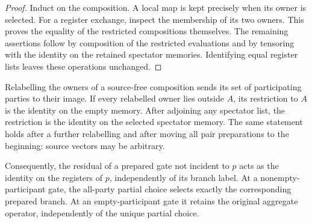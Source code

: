 \begin{proof}
    \leanok
    Induct on the composition. A local map is kept precisely when its owner is
    selected. For a register exchange, inspect the membership of its two owners.
    This proves the equality of the restricted compositions themselves. The
    remaining assertions follow by composition of the restricted evaluations
    and by tensoring with the identity on the retained spectator memories.
    Identifying equal register lists leaves these operations unchanged.
\end{proof}

\begin{theorem}
    \label{thm:peps_chrono_disjoint}
    \leanok
    Relabelling the owners of a source-free composition sends its set of
    participating parties to their image. If every relabelled owner lies outside
    $A$, its restriction to $A$ is the identity on the empty memory.
    After adjoining any spectator list, the restriction is the identity on the
    selected spectator memory. The same statement holds after a further
    relabelling and after moving all pair preparations to the beginning: source
    vectors may be arbitrary.

    Consequently, the residual of a prepared gate not incident to $p$ acts as
    the identity on the registers of $p$, independently of its branch label.
    At a nonempty-participant gate, the all-party partial choice selects exactly
    the corresponding prepared branch. At an empty-participant gate it retains
    the original aggregate operator, independently of the unique partial choice.
\end{theorem}

